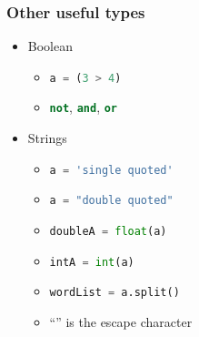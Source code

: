 \documentclass[xcolor=table,10pt,final]{beamer}
\begin{document}
\begin{frame}
  \frametitle{Other useful types}
  \begin{itemize}
    \item Boolean
      \begin{itemize}
        \item \lstinline[language=python]|a = (3 > 4)|
        \item \lstinline[language=python]|not|, \lstinline[language=python]|and|, \lstinline[language=python]|or|
      \end{itemize}
    \item Strings
      \begin{itemize}
        \item \lstinline[language=python]|a = 'single quoted'|
        \item \lstinline[language=python]|a = "double quoted"|
        \item \lstinline[language=python]|doubleA = float(a)|
        \item \lstinline[language=python]|intA = int(a)|
        \item \lstinline[language=python]|wordList = a.split()|
        \item ``'' is the escape character
      \end{itemize}
  \end{itemize}
\end{frame}
\end{document}

